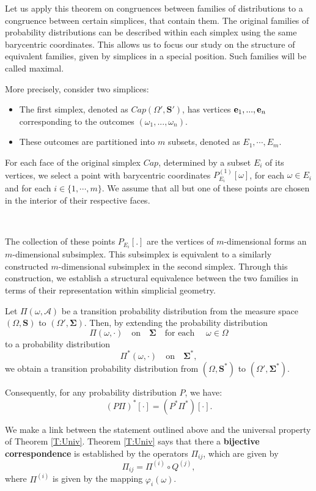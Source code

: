 \begin{example}
Let us apply this theorem on congruences between families of distributions to a congruence between certain simplices, that contain them. The original families of probability distributions can be described within each simplex using the same barycentric coordinates. This allows us to focus our study on the structure of equivalent families, given by simplices in a special position. Such families will be called maximal.

More precisely, consider two simplices:

\begin{itemize}
    \item The first simplex, denoted as $Cap(\Omega',\mathbf{S'})$,  has vertices ${\bf e}_1,...,{\bf e}_n$ corresponding to the  outcomes   $(\omega_1,...,\omega_n)$.
    \item These outcomes are partitioned into 
$m$ subsets, denoted as $E_1,\cdots, E_m$.
\end{itemize}

For each face of the original simplex 
$Cap$, determined by a subset 
$E_i$ of its vertices, we select a point with barycentric coordinates $P_{E_i}^{(1)}[\omega]$, for each  $\omega \in E_i$ and for each $i\in \{1,\cdots,m\}$. We assume that all but one of these points are chosen in the interior of their respective faces.

\, 

The collection of these points 
$P_{E_i} [.]$ are the vertices of $m$-dimensional forms an 
$m$-dimensional subsimplex. This subsimplex is equivalent to a similarly constructed 
$m$-dimensional subsimplex in the second simplex. Through this construction, we establish a structural equivalence between the two families in terms of their representation within simplicial geometry.

%
\end{example}


\begin{theorem}
    Let $\Pi(\omega, \mathcal{A})$ be a transition probability distribution from the measure space $(\Omega, \mathbf{S})$ to $(\Omega', \mathbf{\Sigma})$. Then, by extending the probability distribution \[\Pi(\omega, \cdot)\quad \text{on}\quad \mathbf{\Sigma} \quad \text{for each }\quad \omega \in \Omega\]  to a probability distribution \[\Pi^*(\omega, \cdot) \quad \text{on}\quad \mathbf{\Sigma^*},\] we obtain a transition probability distribution from $(\Omega, \mathbf{S^*})$ to $(\Omega', \mathbf{\Sigma^*})$. 
    
    Consequently, for any probability distribution $P$, we have:
    \[
    (P\Pi)^*[\cdot] = (P^*\Pi^*)[\cdot].
    \]
\end{theorem}
\begin{remark}
We make a link between the statement outlined above and the universal property of Theorem \ref{T:Univ}.  Theorem \ref{T:Univ} says that there a {\bf bijective correspondence} is established by the operators $\Pi_{ij}$, which are given by 
\[\Pi_{ij}=\Pi^{(i)}\circ Q^{(j)},\]
where $\Pi^{(i)}$ is given by the mapping $\varphi_i(\omega)$.
\end{remark}

